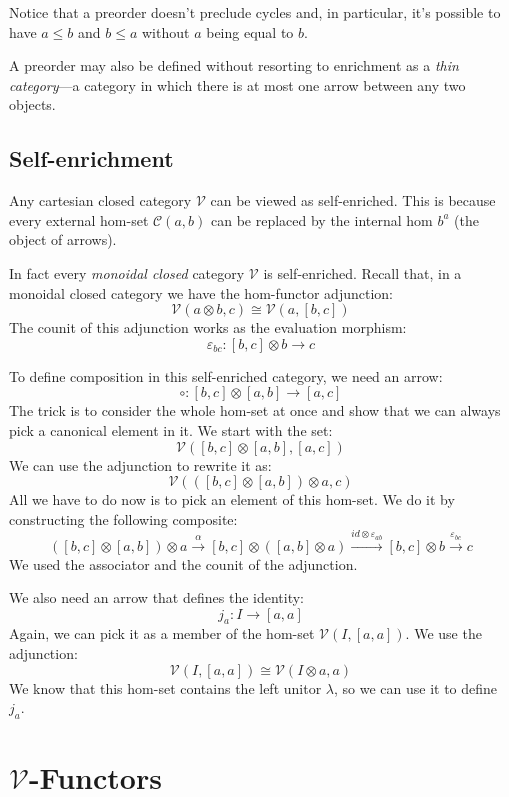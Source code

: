 \documentclass[DaoFP]{subfiles}
\begin{document}
Notice that a preorder doesn't preclude cycles and, in particular, it's possible to have $a \le b$ and $b \le a$ without $a$ being equal to $b$. 

A preorder may also be defined without resorting to enrichment as a \emph{thin category}---a category in which there is at most one arrow between any two objects.

\subsection{Self-enrichment}

Any cartesian closed category $\mathcal V$ can be viewed as self-enriched. This is because every external hom-set $\mathcal C(a, b)$ can be replaced by the internal hom $b^a$ (the object of arrows). 

In fact every \emph{monoidal closed} category $\mathcal V$ is self-enriched. Recall that, in a monoidal closed category we have the hom-functor adjunction:
\[ \mathcal V (a \otimes b, c) \cong \mathcal V (a, [b, c]) \]
The counit of this adjunction works as the evaluation morphism:
\[ \varepsilon_{b c} \colon [b, c] \otimes b \to c \]

To define composition in this self-enriched category, we need an arrow:
\[ \circ \colon [b, c] \otimes [a, b] \to [a, c] \]
The trick is to consider the whole hom-set at once and show that we can always pick a canonical element in it. We start with the set:
\[ \mathcal V([b, c] \otimes [a, b], [a, c]) \]
We can use the adjunction to rewrite it as:
\[  \mathcal V( ([b, c] \otimes [a, b]) \otimes a, c) \]
All we have to do now is to pick an element of this hom-set. We do it by constructing the following composite:
\[ ([b, c] \otimes [a, b]) \otimes a \xrightarrow{\alpha}  
    [b, c] \otimes ([a, b] \otimes a) \xrightarrow{id \otimes \varepsilon_{a b} }
    [b, c] \otimes b \xrightarrow{\varepsilon_{b c}} c \]
We used the associator and the counit of the adjunction.

We also need an arrow that defines the identity:
\[ j_a \colon I \to [a, a] \]
Again, we can pick it as a member of the hom-set $\mathcal V(I, [a, a])$. We use the adjunction:
\[ \mathcal V(I, [a, a]) \cong \mathcal V (I \otimes a, a) \]
We know that this hom-set contains the left unitor $\lambda$, so we can use it to define $j_a$.

\section{$\mathcal V$-Functors} 
\end{document}
